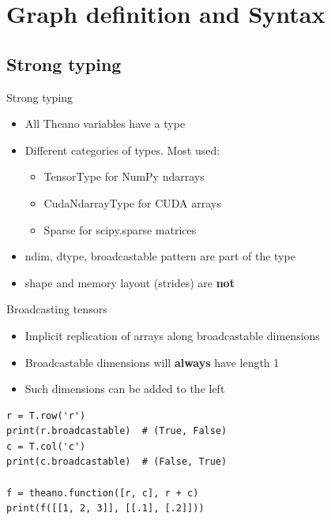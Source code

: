 \documentclass[a4paper,9pt]{beamer}
\begin{document}
\section{Graph definition and Syntax}
\begin{frame}
  \tableofcontents[currentsection]
\end{frame}
\subsection{Strong typing}
\begin{frame}{Strong typing}
  \begin{itemize}
    \item All Theano variables have a type
    \item Different categories of types. Most used:
      \begin{itemize}
        \item TensorType for NumPy ndarrays
        \item CudaNdarrayType for CUDA arrays
        \item Sparse for scipy.sparse matrices
      \end{itemize}
    \item ndim, dtype, broadcastable pattern are part of the type
    \item shape and memory layout (strides) are {\bf not}
  \end{itemize}
\end{frame}

\begin{frame}[fragile]{Broadcasting tensors}
  \begin{itemize}
    \item Implicit replication of arrays along broadcastable dimensions
    \item Broadcastable dimensions will {\bf always} have length 1
    \item Such dimensions can be added to the left
  \end{itemize}
  \begin{verbatim}
r = T.row('r')
print(r.broadcastable)  # (True, False)
c = T.col('c')
print(c.broadcastable)  # (False, True)

f = theano.function([r, c], r + c)
print(f([[1, 2, 3]], [[.1], [.2]]))
  \end{verbatim}
\end{frame}
\end{document}
